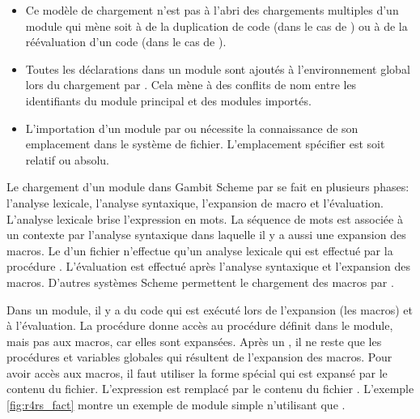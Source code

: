 \begin{itemize}
  \item Ce modèle de chargement n'est pas à l'abri des chargements multiples
    d'un module qui mène soit à de la duplication de code (dans le cas de )
    ou à de la réévaluation d'un code (dans le cas de ).

  \item Toutes les déclarations dans un module sont ajoutés à l'environnement
    global lors du chargement par . Cela mène à des conflits de
    nom entre les identifiants du module principal et des modules importés.

  \item L'importation d'un module par  ou  nécessite la connaissance
    de son emplacement dans le système de fichier. L'emplacement spécifier est soit relatif ou
    absolu.

\end{itemize}


Le chargement d'un module dans Gambit Scheme par  se fait en plusieurs
phases: l'analyse lexicale, l'analyse syntaxique, l'expansion de macro et
l'évaluation. L'analyse lexicale brise l'expression en mots. La séquence de
mots est associée à un contexte par l'analyse syntaxique dans laquelle il y a aussi
une expansion des macros. Le  d'un fichier n'effectue qu'un
analyse lexicale qui est effectué par la procédure . L'évaluation
est effectué après l'analyse syntaxique et l'expansion des macros. D'autres systèmes
Scheme permettent le chargement des macros par .

Dans un module, il y a du code qui est exécuté lors de l'expansion (les macros)
et à l'évaluation. La procédure  donne accès au procédure définit
dans le module, mais pas aux macros, car elles sont expansées.  Après un
, il ne reste que les procédures et variables globales qui
résultent de l'expansion des macros.  Pour avoir accès aux macros, il faut
utiliser la forme spécial  qui est expansé par le contenu du
fichier.  L'expression  est remplacé par le
contenu du fichier . L'exemple \ref{fig:r4rs_fact} montre un
exemple de module simple n'utilisant que .

